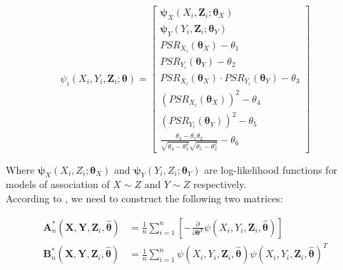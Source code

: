 \documentclass[]{article}
\begin{document}
\[
\psi_i(X_i, Y_i, \pmb{Z}_i; \pmb{\theta}) = \begin{bmatrix}
    \pmb{\psi}_X(X_i,\pmb{Z}_i; \pmb{\theta}_X) \\
    \pmb{\psi}_Y(Y_i,\pmb{Z}_i; \pmb{\theta}_Y) \\
    PSR_{X_{i}}(\pmb{\theta}_X) -\theta_1 \\
    PSR_{Y_{i}}(\pmb{\theta}_Y) -\theta_2 \\
    PSR_{X_{i}}(\pmb{\theta}_X) \cdot PSR_{Y_i}(\pmb{\theta}_Y) -\theta_3 \\
    (PSR_{X_{i}}(\pmb{\theta}_X))^2 -\theta_4 \\
    (PSR_{Y_{i}}(\pmb{\theta}_Y))^2 -\theta_5 \\
    \frac{\theta_3 - \theta_1\theta_2}{\sqrt{\theta_4 - \theta_1^2}\sqrt{\theta_5 - \theta_2^2}} - \theta_6
\end{bmatrix}
\]

Where $\pmb{\psi}_X(X_i,Z_i; \pmb{\theta}_X)$ and $\pmb{\psi}_Y(Y_i,Z_i; \pmb{\theta}_Y)$ are log-likelihood functions for models of association of $X\sim Z $ and $Y \sim Z$ respectively.\\
According to \cite{stefanski2002calculus}, we need to construct the following two matrices:

	
	$$
	\begin{aligned}
		\pmb{A}^*_n(\pmb{X}, \pmb{Y}, \pmb{Z}_i, \hat{\pmb{\theta}}) &= \frac{1}{n} \sum_{i = 1}^{n}\left[ -\frac{\partial}{\partial \pmb{\theta}^T}\psi(X_i, Y_i, \pmb{Z}_i, \hat{\pmb{\theta}}) \right]\\
		\pmb{B}^*_n(\pmb{X}, \pmb{Y}, \pmb{Z}_i, \hat{\pmb{\theta}}) &= \frac{1}{n} \sum_{i = 1}^{n} \psi(X_i, Y_i, \pmb{Z}_i, \hat{\pmb{\theta}}) \psi(X_i, Y_i, \pmb{Z}_i, \hat{\pmb{\theta}})^T\\
 	\end{aligned}
	$$
\end{document}
